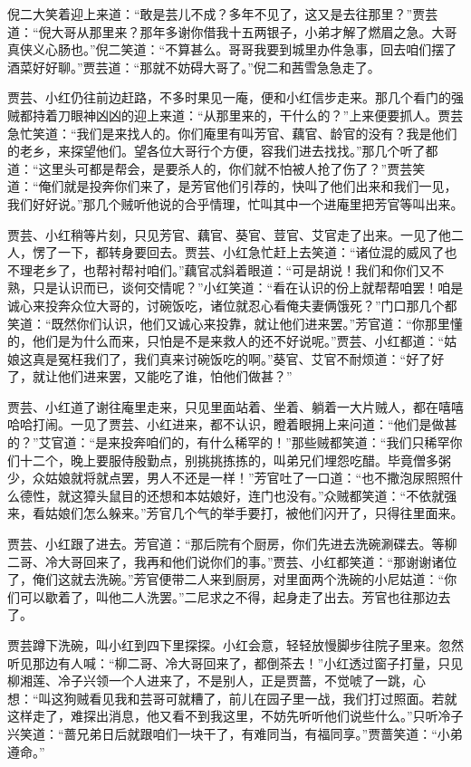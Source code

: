 \documentclass[12pt,oneside]{book}
\begin{document}
倪二大笑着迎上来道：“敢是芸儿不成？多年不见了，这又是去往那里？”贾芸道：“倪大哥从那里来？那年多谢你借我十五两银子，小弟才解了燃眉之急。大哥真侠义心肠也。”倪二笑道：“不算甚么。哥哥我要到城里办件急事，回去咱们摆了酒菜好好聊。”贾芸道：“那就不妨碍大哥了。”倪二和茜雪急急走了。

贾芸、小红仍往前边赶路，不多时果见一庵，便和小红信步走来。那几个看门的强贼都持着刀眼神凶凶的迎上来道：“从那里来的，干什么的？”上来便要抓人。贾芸急忙笑道：“我们是来找人的。你们庵里有叫芳官、藕官、龄官的没有？我是他们的老乡，来探望他们。望各位大哥行个方便，容我们进去找找。”那几个听了都道：“这里头可都是帮会，是要杀人的，你们就不怕被人抢了伤了？”贾芸笑道：“俺们就是投奔你们来了，是芳官他们引荐的，快叫了他们出来和我们一见，我们好好说。”那几个贼听他说的合乎情理，忙叫其中一个进庵里把芳官等叫出来。

贾芸、小红稍等片刻，只见芳官、藕官、葵官、荳官、艾官走了出来。一见了他二人，愣了一下，都转身要回去。贾芸、小红急忙赶上去笑道：“诸位混的威风了也不理老乡了，也帮衬帮衬咱们。”藕官忒斜着眼道：“可是胡说！我们和你们又不熟，只是认识而已，谈何交情呢？”小红笑道：“看在认识的份上就帮帮咱罢！咱是诚心来投奔众位大哥的，讨碗饭吃，诸位就忍心看俺夫妻俩饿死？”门口那几个都笑道：“既然你们认识，他们又诚心来投靠，就让他们进来罢。”芳官道：“你那里懂的，他们是为什么而来，只怕是不是来救人的还不好说呢。”贾芸、小红都道：“姑娘这真是冤枉我们了，我们真来讨碗饭吃的啊。”葵官、艾官不耐烦道：“好了好了，就让他们进来罢，又能吃了谁，怕他们做甚？”

贾芸、小红道了谢往庵里走来，只见里面站着、坐着、躺着一大片贼人，都在嘻嘻哈哈打闹。一见了贾芸、小红进来，都不认识，瞪着眼拥上来问道：“他们是做甚的？”艾官道：“是来投奔咱们的，有什么稀罕的！”那些贼都笑道：“我们只稀罕你们十二个，晚上要服侍殷勤点，别挑挑拣拣的，叫弟兄们埋怨吃醋。毕竟僧多粥少，众姑娘就将就点罢，男人不还是一样！”芳官吐了一口道：“也不撒泡尿照照什么德性，就这獐头鼠目的还想和本姑娘好，连门也没有。”众贼都笑道：“不依就强来，看姑娘们怎么躲来。”芳官几个气的举手要打，被他们闪开了，只得往里面来。

贾芸、小红跟了进去。芳官道：“那后院有个厨房，你们先进去洗碗涮碟去。等柳二哥、冷大哥回来了，我再和他们说你们的事。”贾芸、小红都笑道：“那谢谢诸位了，俺们这就去洗碗。”芳官便带二人来到厨房，对里面两个洗碗的小尼姑道：“你们可以歇着了，叫他二人洗罢。”二尼求之不得，起身走了出去。芳官也往那边去了。

贾芸蹲下洗碗，叫小红到四下里探探。小红会意，轻轻放慢脚步往院子里来。忽然听见那边有人喊：“柳二哥、冷大哥回来了，都倒茶去！”小红透过窗子打量，只见柳湘莲、冷子兴领一个人进来了，不是别人，正是贾蔷，不觉唬了一跳，心想：“叫这狗贼看见我和芸哥可就糟了，前儿在园子里一战，我们打过照面。若就这样走了，难探出消息，他又看不到我这里，不妨先听听他们说些什么。”只听冷子兴笑道：“蔷兄弟日后就跟咱们一块干了，有难同当，有福同享。”贾蔷笑道：“小弟遵命。”
\end{document}
